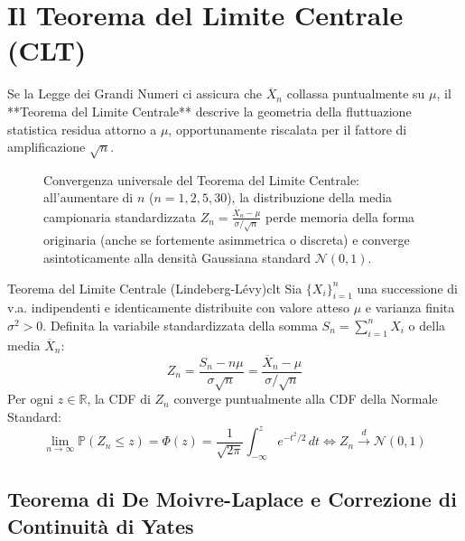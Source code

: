 \section{Il Teorema del Limite Centrale (CLT)}
\label{sec:teorema_limite_centrale}

Se la Legge dei Grandi Numeri ci assicura che $\overline{X}_n$ collassa puntualmente su $\mu$, il **Teorema del Limite Centrale** descrive la geometria della fluttuazione statistica residua attorno a $\mu$, opportunamente riscalata per il fattore di amplificazione $\sqrt{n}$.

\begin{figure}[htbp]
    \centering
    
    \caption{Convergenza universale del Teorema del Limite Centrale: all'aumentare di $n$ ($n=1, 2, 5, 30$), la distribuzione della media campionaria standardizzata $Z_n = \frac{\overline{X}_n - \mu}{\sigma/\sqrt{n}}$ perde memoria della forma originaria (anche se fortemente asimmetrica o discreta) e converge asintoticamente alla densità Gaussiana standard $\mathcal{N}(0,1)$.}
    \label{fig:clt_convergenza}
\end{figure}

\begin{teorema}{Teorema del Limite Centrale (Lindeberg-Lévy)}{clt}
Sia $\{X_i\}_{i=1}^n$ una successione di v.a. indipendenti e identicamente distribuite con valore atteso $\mu$ e varianza finita $\sigma^2 > 0$.
Definita la variabile standardizzata della somma $S_n = \sum_{i=1}^n X_i$ o della media $\overline{X}_n$:
\begin{equation}
    Z_n = \frac{S_n - n\mu}{\sigma \sqrt{n}} = \frac{\overline{X}_n - \mu}{\sigma / \sqrt{n}}
\end{equation}
Per ogni $z \in \mathbb{R}$, la CDF di $Z_n$ converge puntualmente alla CDF della Normale Standard:
\begin{equation}
    \lim_{n \to \infty} \mathbb{P}(Z_n \le z) = \Phi(z) = \frac{1}{\sqrt{2\pi}} \int_{-\infty}^z e^{-t^2/2} \, dt \iff Z_n \xrightarrow{d} \mathcal{N}(0, 1)
\end{equation}
\end{teorema}

\subsection{Teorema di De Moivre-Laplace e Correzione di Continuità di Yates}

